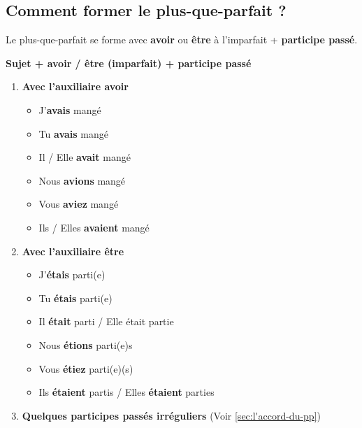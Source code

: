 \documentclass[math,code]{amznotes}
\theoremstyle{remark}
\begin{document}
\subsection*{Comment former le plus-que-parfait ?}

Le plus-que-parfait se forme avec \textbf{avoir} ou \textbf{être} à l'imparfait + \textbf{participe passé}.

\begin{center}
    \textbf{Sujet + avoir / être (imparfait) + participe passé}
\end{center}

\begin{enumerate}
    \item \textbf{Avec l'auxiliaire avoir}
    \begin{itemize}
        \item J'\textbf{avais} mangé
        \item Tu \textbf{avais} mangé
        \item Il / Elle \textbf{avait} mangé
        \item Nous \textbf{avions} mangé
        \item Vous \textbf{aviez} mangé
        \item Ils / Elles \textbf{avaient} mangé
    \end{itemize}

    \item \textbf{Avec l'auxiliaire être}
    \begin{itemize}
        \item J'\textbf{étais} parti(e)
        \item Tu \textbf{étais} parti(e)
        \item Il \textbf{était} parti / Elle était partie
        \item Nous \textbf{étions} parti(e)s
        \item Vous \textbf{étiez} parti(e)(s)
        \item Ils \textbf{étaient} partis / Elles \textbf{étaient} parties
    \end{itemize}

    \item \textbf{Quelques participes passés irréguliers} (Voir \ref{sec:l'accord-du-pp})
\end{enumerate}
\end{document}
